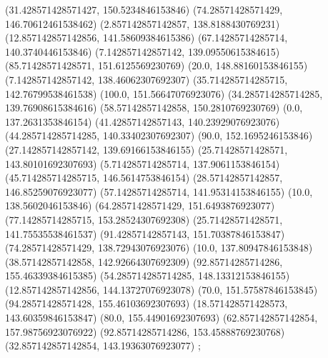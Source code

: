 {{{		(31.428571428571427, 150.5234846153846)
		(74.28571428571429, 146.70612461538462)
		(2.857142857142857, 138.8188430769231)
		(12.857142857142856, 141.58609384615386)
		(67.14285714285714, 140.3740446153846)
		(7.142857142857142, 139.09550615384615)
		(85.71428571428571, 151.6125569230769)
		(20.0, 148.88160153846155)
		(7.142857142857142, 138.46062307692307)
		(35.714285714285715, 142.76799538461538)
		(100.0, 151.56647076923076)
		(34.285714285714285, 139.76908615384616)
		(58.57142857142858, 150.2810769230769)
		(0.0, 137.2631353846154)
		(41.42857142857143, 140.23929076923076)
		(44.285714285714285, 140.33402307692307)
		(90.0, 152.1695246153846)
		(27.142857142857142, 139.69166153846155)
		(25.71428571428571, 143.80101692307693)
		(5.714285714285714, 137.9061153846154)
		(45.714285714285715, 146.5614753846154)
		(28.57142857142857, 146.85259076923077)
		(57.14285714285714, 141.95314153846155)
		(10.0, 138.5602046153846)
		(64.28571428571429, 151.6493876923077)
		(77.14285714285715, 153.28524307692308)
		(25.71428571428571, 141.75535538461537)
		(91.42857142857143, 151.70387846153847)
		(74.28571428571429, 138.72943076923076)
		(10.0, 137.80947846153848)
		(38.57142857142858, 142.92664307692309)
		(92.85714285714286, 155.46339384615385)
		(54.285714285714285, 148.13312153846155)
		(12.857142857142856, 144.13727076923078)
		(70.0, 151.57587846153845)
		(94.28571428571428, 155.46103692307693)
		(18.571428571428573, 143.60359846153847)
		(80.0, 155.44901692307693)
		(62.857142857142854, 157.98756923076922)
		(92.85714285714286, 153.45888769230768)
		(32.857142857142854, 143.19363076923077)
	};

}}
